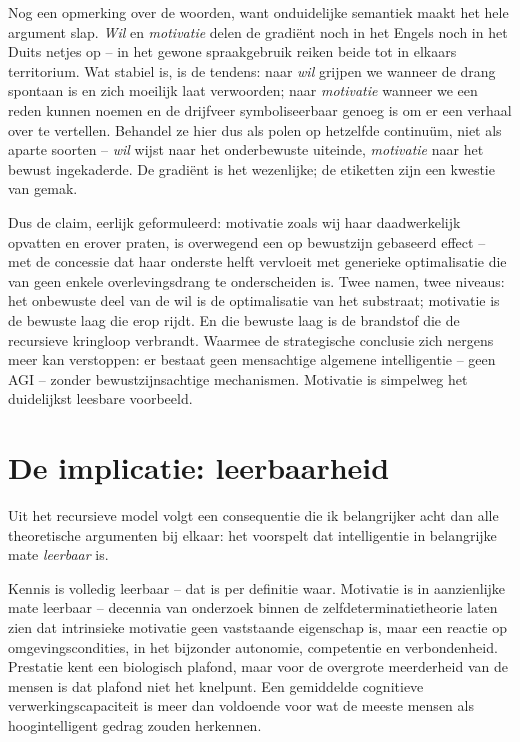 \documentclass[11pt, twoside, openright]{book}
\begin{document}
Nog een opmerking over de woorden, want onduidelijke semantiek maakt het hele argument slap. \textit{Wil} en \textit{motivatie} delen de gradiënt noch in het Engels noch in het Duits netjes op -- in het gewone spraakgebruik reiken beide tot in elkaars territorium. Wat stabiel is, is de tendens: naar \textit{wil} grijpen we wanneer de drang spontaan is en zich moeilijk laat verwoorden; naar \textit{motivatie} wanneer we een reden kunnen noemen en de drijfveer symboliseerbaar genoeg is om er een verhaal over te vertellen. Behandel ze hier dus als polen op hetzelfde continuüm, niet als aparte soorten -- \textit{wil} wijst naar het onderbewuste uiteinde, \textit{motivatie} naar het bewust ingekaderde. De gradiënt is het wezenlijke; de etiketten zijn een kwestie van gemak.

Dus de claim, eerlijk geformuleerd: motivatie zoals wij haar daadwerkelijk opvatten en erover praten, is overwegend een op bewustzijn gebaseerd effect -- met de concessie dat haar onderste helft vervloeit met generieke optimalisatie die van geen enkele overlevingsdrang te onderscheiden is. Twee namen, twee niveaus: het onbewuste deel van de wil is de optimalisatie van het substraat; motivatie is de bewuste laag die erop rijdt. En die bewuste laag is de brandstof die de recursieve kringloop verbrandt. Waarmee de strategische conclusie zich nergens meer kan verstoppen: er bestaat geen mensachtige algemene intelligentie -- geen AGI -- zonder bewustzijnsachtige mechanismen. Motivatie is simpelweg het duidelijkst leesbare voorbeeld.

\section*{De implicatie: leerbaarheid}

Uit het recursieve model volgt een consequentie die ik belangrijker acht dan alle theoretische argumenten bij elkaar: het voorspelt dat intelligentie in belangrijke mate \textit{leerbaar} is.

Kennis is volledig leerbaar -- dat is per definitie waar. Motivatie is in aanzienlijke mate leerbaar -- decennia van onderzoek binnen de zelfdeterminatietheorie laten zien dat intrinsieke motivatie geen vaststaande eigenschap is, maar een reactie op omgevingscondities, in het bijzonder autonomie, competentie en verbondenheid. Prestatie kent een biologisch plafond, maar voor de overgrote meerderheid van de mensen is dat plafond niet het knelpunt. Een gemiddelde cognitieve verwerkingscapaciteit is meer dan voldoende voor wat de meeste mensen als hoogintelligent gedrag zouden herkennen.
\end{document}
